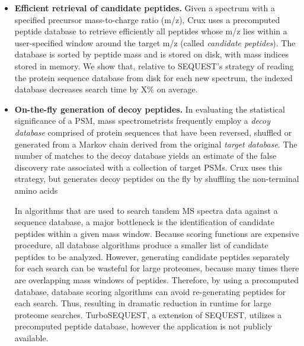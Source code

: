 \documentclass{bioinfo}
\begin{document}
\begin{itemize}

\item {\bf Efficient retrieval of candidate peptides.}  Given a
  spectrum with a specified precursor mass-to-charge ratio (m/z), Crux
  uses a precomputed peptide database to retrieve efficiently all
  peptides whose m/z lies within a user-specified window around the
  target m/z (called {\em candidate peptides}).  The database is
  sorted by peptide mass and is stored on disk, with mass indices
  stored in memory.  We show that, relative to SEQUEST's strategy of
  reading the protein sequence database from disk for each new
  spectrum, the indexed database decreases search time by X\% on
  average.

\item {\bf On-the-fly generation of decoy peptides.}  In evaluating
  the statistical significance of a PSM, mass spectrometrists
  frequently employ a {\em decoy database} comprised of protein
  sequences that have been reversed, shuffled or generated from a
  Markov chain derived from the original {\em target database}.
  The number of matches to the decoy database yields an estimate of
  the false discovery rate associated with a collection of target
  PSMs.  Crux uses this strategy, but generates decoy peptides on the
  fly by shuffling the non-terminal amino acids 

In algorithms that are used to search tandem MS spectra data against a
sequence database, a major bottleneck is the identification of
candidate peptides within a given mass window. Because scoring
functions are expensive procedure, all database algorithms produce a
smaller list of candidate peptides to be analyzed. However, generating
candidate peptides separately for each search can be wasteful for
large proteomes, because many times there are overlapping mass windows
of peptides. Therefore, by using a precomputed database, database
scoring algorithms can avoid re-generating peptides for each
search. Thus, resulting in dramatic reduction in runtime for large
proteome searches. TurboSEQUEST, a extension of SEQUEST, utilizes a
precomputed peptide database, however the application is not publicly
available.




\end{itemize}
\end{document}
